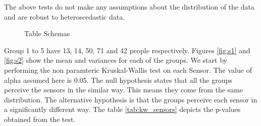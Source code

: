 The above tests do not make any assumptions about the distribution of the data and are robust to heteroscedastic data.
\begin{figure}[htp]
\caption{Table Schemas}
\label{fig:s3}
\end{figure}

Group 1 to 5 have 13, 14, 50, 71 and 42 people respectively. Figures \ref{fig:s1} and \ref{fig:s2} show the mean and variances for each of the groups. We start by performing the non paramteric Kruskal-Wallis test on each Sensor. The value of alpha assumed here is 0.05. The null hypothesis states that all the groups perceive the sensors in the similar way. This means they come from the same distribution. The alternative hypothesis is
that the groups perceive each sensor in a significantly different way. The table \ref{tab:kw_sensors} depicts the p-values obtained from the test.

